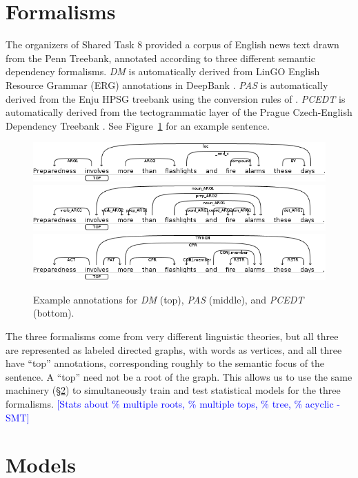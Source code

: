 \documentclass[11pt]{article}
\newcommand{\sam}[1]{\textcolor{blue}{[#1 -SMT]}}
\begin{document}
\section{Formalisms} \label{s:formalisms}

The organizers of Shared Task 8 provided a corpus of English news text
drawn from the Penn Treebank, annotated according to three different semantic dependency formalisms.
\emph{DM} is automatically derived from LinGO English Resource Grammar (ERG)
annotations in DeepBank \cite{flickinger_deepbank_2012}.
\emph{PAS} is automatically derived from the Enju HPSG treebank using the
conversion rules of .
\emph{PCEDT} is automatically derived from the tectogrammatic layer of the
Prague Czech-English Dependency Treebank \cite{hajic_building_1998}.
See Figure~\ref{fig:formalisms} for an example sentence.
\begin{figure}
	\centering
		\includegraphics[width=.5\textwidth]{fig/example_dm} \\
		\includegraphics[width=.5\textwidth]{fig/example_pas} \\
		\includegraphics[width=.5\textwidth]{fig/example_pcedt}
	\caption{Example annotations for \emph{DM} (top), \emph{PAS}
          (middle), and \emph{PCEDT} (bottom).}
	\label{fig:formalisms}
\end{figure}

The three formalisms come from very different linguistic theories, but all
three are represented as labeled directed graphs, with words as vertices, and
all three have ``top'' annotations, corresponding roughly to the
semantic focus of the sentence.  A ``top'' need not be a root of the
graph.
This allows us to use the same machinery (\S\ref{s:models}) to simultaneously
train and test statistical models for the three formalisms.
\sam{Stats about \% multiple roots, \% multiple tops, \% tree, \% acyclic}



\section{Models} \label{s:models}
\end{document}
